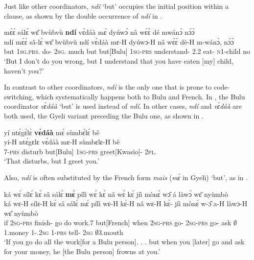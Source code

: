 \noindent Just like other coordinators, {\itshape ndí} `but' occupies the initial position within a clause, as shown by the double occurrence of {\itshape ndí} in .


\ea\label{but4}
   mɛ̀ɛ́ sálɛ́ wɛ̂ bvùbvù {\bfseries ndí} vɛ̀dáà mɛ́ dyúwɔ́ nâ wɛ́ɛ̀ dé mwánɔ̀ nɔ́ɔ̀ \\
        ndí mɛ̀ɛ́ sâ-lɛ́ wɛ̂ bvùbvù ndí vɛ̀dáà mɛ-H dyúwɔ-H nâ wɛ́ɛ̀ dè-H m-wánɔ̀, nɔ́ɔ̀ \\
       but 1\textsc{sg}.\textsc{prs}.{\NEG} do-{\NEG} 2\textsc{sg}.{\OBJ} much but but[Bulu] 1\textsc{sg}-\textsc{prs} understand-{\R} {\COMP} 2.{\PST}2 eat-{\R} \textsc{n}1-child no  \\
    \trans `But I don't do you wrong, but I understand that you have eaten [my] child, haven't you?'
\z


In contrast to other coordinators, {\itshape ndí} is the only one that is prone to code-switching, which systematically happens both to Bulu and French. In , the Bulu coordinator {\itshape vɛ̀dáà} `but' is used instead of {\itshape ndí}. In other cases, {\itshape ndí} and {\itshape vɛ̀dáà} are both used, the Gyeli variant preceding the Bulu one, as shown in .



\ea\label{but5}
  \glll      yí ntɛ́gɛ̀lɛ̀ {\bfseries vɛ̀dáà} mɛ́ sùmbɛ́lɛ́ bê \\
           yi-H ntɛ́gɛlɛ vɛ̀dáà mɛ-H sùmbɛlɛ-H bê \\
              7-\textsc{prs} disturb but[Bulu] 1\textsc{sg}-\textsc{prs} greet[Kwasio]-{\R} 2\textsc{pl}.{\OBJ}  \\
    \trans `That disturbs, but I greet you.'
\z

\noindent Also, {\itshape ndí} is often substituted by the French form {\itshape mais} ({\itshape mɛ́} in Gyeli) `but', as in .


\ea\label{but6}
  \glll ká wɛ́ sílɛ́ kɛ̀ sâ sálɛ́ {\bfseries mɛ́} pílì wɛ́ kɛ́ nâ  wɛ́ kɛ́ jíì mònɛ́ wɔ̂ á làwɔ́ wɛ̂ nyùmbò\\
        ká wɛ-H sílɛ-H kɛ̀ sâ sálɛ́ mɛ́ pílì wɛ-H kɛ̀-H nâ  wɛ-H kɛ̀-{\R} jíì mònɛ́ w-ɔ̂ a-H làwɔ-H wɛ̂ nyùmbò\\
         if 2\textsc{sg}-\textsc{prs} finish-{\R} go do work.7 but[French] when 2\textsc{sg}-\textsc{prs} go-{\R} {\COMP} 2\textsc{sg}-\textsc{prs} go-{\R} ask $\emptyset$1.money 1-{\POSS}.2\textsc{sg} 1-\textsc{prs} tell-{\R} 2\textsc{sg} $\emptyset$3.mouth   \\
    \trans `If you go do all the work[for a Bulu person]. . . but when you [later] go and ask for your money, he [the Bulu person] frowns at you.'
\z





